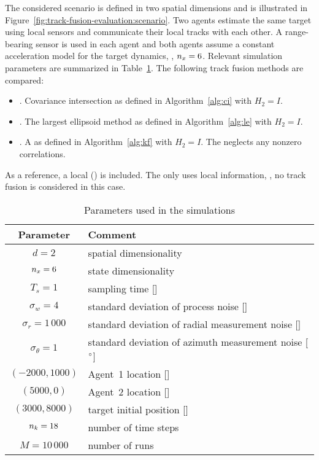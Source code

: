 The considered scenario is defined in two spatial dimensions and is illustrated in Figure~\ref{fig:track-fusion-evaluation:scenario}. Two agents estimate the same target using local sensors and communicate their local tracks with each other. A range-bearing sensor is used in each agent and both agents assume a constant acceleration model for the target dynamics, \ie, $n_x=6$. Relevant simulation parameters are summarized in Table~\ref{tab:track-fusion-evaluation:parameters}. The following track fusion methods are compared:
\begin{itemize}
	\item \abbrCI. Covariance intersection as defined in Algorithm~\ref{alg:ci} with $H_2=I$.
	\item \abbrLE. The largest ellipsoid method as defined in Algorithm~\ref{alg:le} with $H_2=I$.
	\item \abbrNKF. A \naive \abbrKF as defined in Algorithm~\ref{alg:kf} with $H_2=I$. The \abbrNKF neglects any nonzero correlations.
\end{itemize}
As a reference, a local \abbrKF (\abbrLKF) is included. The \abbrLKF only uses local information, \ie, no track fusion is considered in this case.

\begin{table}[tb]
	\centering
	\caption{Parameters used in the simulations}
	\label{tab:track-fusion-evaluation:parameters}
	\begin{footnotesize}
	\begin{tabular}{cl}
		\toprule%
		\textbf{Parameter} & \textbf{Comment} \\
		\midrule
		$d=2$ & spatial dimensionality \\
		$n_x=6$ & state dimensionality \\
		$T_s=1$ & sampling time [\second] \\
		$\sigma_{w}=4$ & standard deviation of process noise [\unitsigmawcam] \\		
		$\sigma_r=1\,000$ & standard deviation of radial measurement noise [\meter] \\
		$\sigma_\theta=1$ & standard deviation of azimuth measurement noise [$^\circ$] \\
		$(-2000,1000)$ & Agent~1 location [\meter] \\
		$(5000,0)$ & Agent~2 location [\meter] \\
		$(3000,8000)$ & target initial position [\meter] \\
		$n_k=18$ & number of time steps \\
		$M=10\,000$ & number of \abbrMC runs \\
		\bottomrule
	\end{tabular}	
	\end{footnotesize}
\end{table}



